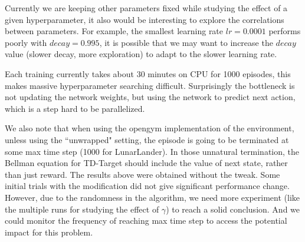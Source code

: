 \documentclass[conference]{IEEEtran}
\begin{document}
Currently we are keeping other parameters fixed while studying the effect of a given hyperparameter, it also would be interesting to explore the correlations between parameters. For example, the smallest learning rate $lr=0.0001$ performs poorly with $decay=0.995$, it is possible that we may want to increase the $decay$ value (slower decay, more exploration) to adapt to the slower learning rate.

Each training currently takes about 30 minutes on CPU for 1000 episodes, this makes massive hyperparameter searching difficult. Surprisingly the bottleneck is not updating the network weights, but using the network to predict next action, which is a step hard to be parallelized.

We also note that when using the opengym implementation of the environment, unless using the ``unwrapped" setting, the episode is going to be terminated at some max time step (1000 for LunarLander). In those unnatural termination, the Bellman equation for TD-Target should include the value of next state, rather than just reward. The results above were obtained without the tweak. Some initial trials with the modification did not give significant performance change. However, due to the randomness in the algorithm, we need more experiment (like the multiple runs for studying the effect of $\gamma$) to reach a solid conclusion. And we could monitor the frequency of reaching max time step to access the potential impact for this problem.

	


\end{document}
